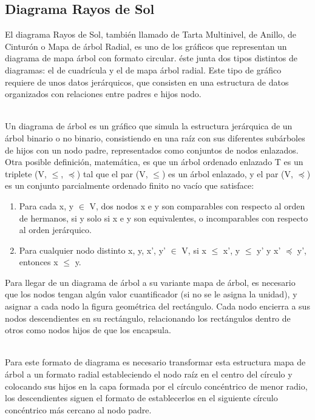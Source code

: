 \documentclass{article}\usepackage[]{graphicx}\usepackage[]{color}
\begin{document}
\subsection{Diagrama Rayos de Sol}\label{ssec:rayos}
El diagrama Rayos de Sol, tambi\'en llamado de Tarta Multinivel, de Anillo, de Cintur\'on o Mapa de \'arbol Radial, es uno de los gr\'aficos que representan un diagrama de mapa \'arbol con formato circular. \'este junta dos tipos distintos de diagramas: el de cuadr\'icula y el de mapa \'arbol radial. Este tipo de gr\'afico requiere de unos datos jer\'arquicos, que consisten en una estructura de datos organizados con relaciones entre padres e hijos nodo.~\\~\par
Un diagrama de \'arbol es un gr\'afico que simula la estructura jer\'arquica de un \'arbol binario o no binario, consistiendo en una ra\'iz con sus diferentes sub\'arboles de hijos con un nodo padre, representados como conjuntos de nodos enlazados. Otra posible definici\'on\cite[p\'ag. 36]{tree-book}, matem\'atica, es que un \'arbol ordenado enlazado T es un triplete (V, $\leq$, $\preceq$) tal que el par (V, $\leq$) es un \'arbol enlazado, y el par (V, $\preceq$) es un conjunto parcialmente ordenado finito no vac\'io que satisface:
\begin{enumerate}
	\item Para cada x, y $\in$ V, dos nodos x e y son comparables con respecto al orden de hermanos, si y solo si x e y son equivalentes, o incomparables con respecto al orden jer\'arquico.
	\item Para cualquier nodo distinto x, y, x’, y’ $\in$ V, si x $\leq$ x’, y $\leq$ y’ y x’ $\preceq$ y’, entonces x $\leq$ y.
\end{enumerate}
Para llegar de un diagrama de \'arbol a su variante mapa de \'arbol, es necesario que los nodos tengan alg\'un valor cuantificador (si no se le asigna la unidad), y asignar a cada nodo la figura geom\'etrica del rect\'angulo. Cada nodo encierra a sus nodos descendientes en su rect\'angulo, relacionando los rect\'angulos dentro de otros como nodos hijos de que los encapsula\cite{tree-map}\cite{busines-tree}.~\\~\par
Para este formato de diagrama es necesario transformar esta estructura mapa de \'arbol a un formato radial estableciendo el nodo ra\'iz en el centro del c\'irculo y colocando sus hijos en la capa formada por el c\'irculo conc\'entrico de menor radio, los descendientes siguen el formato de establecerlos en el siguiente c\'irculo conc\'entrico m\'as cercano al nodo padre\cite{radial-tree-example}\cite{radial-tree}.~\\~\par
\end{document}
